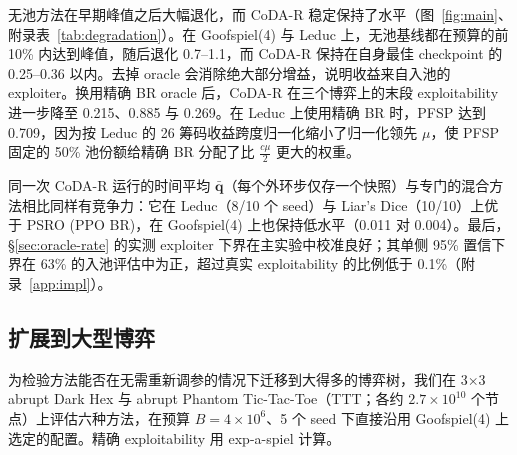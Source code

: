 \documentclass{article}
\theoremstyle{plain}
\theoremstyle{remark}
\newcommand{\bq}{{\bm{q}}}
\newcommand{\codar}{CoDA-R}
\begin{document}
无池方法在早期峰值之后大幅退化，而 \codar{} 稳定保持了水平（图~\ref{fig:main}、附录表~\ref{tab:degradation}）。在 Goofspiel(4) 与 Leduc 上，无池基线都在预算的前 10\% 内达到峰值，随后退化 0.7--1.1，而 \codar{} 保持在自身最佳 checkpoint 的 0.25--0.36 以内。去掉 oracle 会消除绝大部分增益，说明收益来自入池的 exploiter。换用精确 BR oracle 后，\codar{} 在三个博弈上的末段 exploitability 进一步降至 0.215、0.885 与 0.269。在 Leduc 上使用精确 BR 时，PFSP 达到 0.709，因为按 Leduc 的 26 筹码收益跨度归一化缩小了归一化领先 $\mu$，使 PFSP 固定的 50\% 池份额给精确 BR 分配了比 $\tfrac{c\mu}2$ 更大的权重。

同一次 \codar{} 运行的时间平均 $\bar{\bq}$（每个外环步仅存一个快照）与专门的混合方法相比同样有竞争力：它在 Leduc（8/10 个 seed）与 Liar's Dice（10/10）上优于 PSRO (PPO BR)，在 Goofspiel(4) 上也保持低水平（0.011 对 0.004）。最后，\S\ref{sec:oracle-rate} 的实测 exploiter 下界在主实验中校准良好；其单侧 95\% 置信下界在 63\% 的入池评估中为正，超过真实 exploitability 的比例低于 0.1\%（附录~\ref{app:impl}）。

\subsection{扩展到大型博弈}
\label{sec:exp-scale}

为检验方法能否在无需重新调参的情况下迁移到大得多的博弈树，我们在 3$\times$3 abrupt Dark Hex 与 abrupt Phantom Tic-Tac-Toe（TTT；各约 $2.7\times10^{10}$ 个节点）上评估六种方法，在预算 $B=4\times10^6$、5 个 seed 下直接沿用 Goofspiel(4) 上选定的配置。精确 exploitability 用 exp-a-spiel\citep{rudolph2025reevaluating} 计算。
\end{document}

